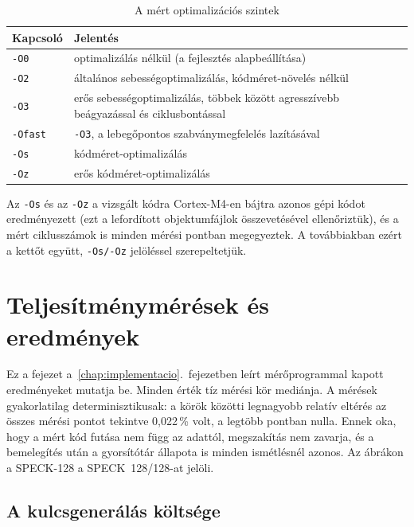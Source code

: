 \documentclass[a4paper,12pt]{report}
\theoremstyle{definition}
\theoremstyle{remark}
\begin{document}
\begin{table}[htbp]
    \centering
    \small
    \caption{A mért optimalizációs szintek}
    \label{tab:build_config}
    \begin{tabular}{|l|p{11cm}|}
        \hline
        \textbf{Kapcsoló} & \textbf{Jelentés} \\ \hline
        \texttt{-O0} & optimalizálás nélkül (a fejlesztés alapbeállítása) \\ \hline
        \texttt{-O2} & általános sebességoptimalizálás, kódméret-növelés nélkül \\ \hline
        \texttt{-O3} & erős sebességoptimalizálás, többek között agresszívebb beágyazással és ciklusbontással \\ \hline
        \texttt{-Ofast} & \texttt{-O3}, a lebegőpontos szabványmegfelelés lazításával \\ \hline
        \texttt{-Os} & kódméret-optimalizálás \\ \hline
        \texttt{-Oz} & erős kódméret-optimalizálás \\ \hline
    \end{tabular}
\end{table}

Az \texttt{-Os} és az \texttt{-Oz} a vizsgált kódra Cortex-M4-en bájtra azonos gépi kódot eredményezett (ezt a lefordított objektumfájlok összevetésével ellenőriztük), és a mért ciklusszámok is minden mérési pontban megegyeztek. A továbbiakban ezért a kettőt együtt, \texttt{-Os/-Oz} jelöléssel szerepeltetjük.

\chapter{Teljesítménymérések és eredmények}\label{chap:meresek}

Ez a fejezet a~\ref{chap:implementacio}.~fejezetben leírt mérőprogrammal kapott eredményeket mutatja be. Minden érték tíz mérési kör mediánja. A mérések gyakorlatilag determinisztikusak: a körök közötti legnagyobb relatív eltérés az összes mérési pontot tekintve 0,022\,\% volt, a legtöbb pontban nulla. Ennek oka, hogy a mért kód futása nem függ az adattól, megszakítás nem zavarja, és a bemelegítés után a gyorsítótár állapota is minden ismétlésnél azonos. Az ábrákon a SPECK-128 a SPECK~128/128-at jelöli.

\section{A kulcsgenerálás költsége}\label{sec:keygen}
\end{document}
